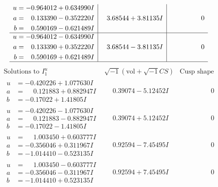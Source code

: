 \documentclass[1p]{elsarticle_modified}
\theoremstyle{definition}
\newcommand{\I}{\sqrt{-1}}
\begin{document}
$$\begin{array}{c|c|c}
\begin{aligned}
u &= -0.964012 + 0.634990 I \\
a &= \phantom{-}0.133390 - 0.352220 I \\
b &= \phantom{-}0.590169 - 0.621489 I\end{aligned}
 & \phantom{-}3.68544 + 3.81135 I & \phantom{-0.000000 } 0 \\ \hline\begin{aligned}
u &= -0.964012 - 0.634990 I \\
a &= \phantom{-}0.133390 + 0.352220 I \\
b &= \phantom{-}0.590169 + 0.621489 I\end{aligned}
 & \phantom{-}3.68544 - 3.81135 I & \phantom{-0.000000 } 0\\
 \hline 
 \end{array}$$\newpage$$\begin{array}{c|c|c}  
\text{Solutions to }I^u_{1}& \I (\text{vol} + \sqrt{-1}CS) & \text{Cusp shape}\\
 \hline 
\begin{aligned}
u &= -0.420226 + 1.077630 I \\
a &= \phantom{-}0.121883 + 0.882947 I \\
b &= -0.17022 + 1.41805 I\end{aligned}
 & \phantom{-}0.39074 - 5.12452 I & \phantom{-0.000000 } 0 \\ \hline\begin{aligned}
u &= -0.420226 - 1.077630 I \\
a &= \phantom{-}0.121883 - 0.882947 I \\
b &= -0.17022 - 1.41805 I\end{aligned}
 & \phantom{-}0.39074 + 5.12452 I & \phantom{-0.000000 } 0 \\ \hline\begin{aligned}
u &= \phantom{-}1.003450 + 0.603777 I \\
a &= -0.356046 + 0.311967 I \\
b &= -1.014410 - 0.523135 I\end{aligned}
 & \phantom{-}0.92594 - 7.45495 I & \phantom{-0.000000 } 0 \\ \hline\begin{aligned}
u &= \phantom{-}1.003450 - 0.603777 I \\
a &= -0.356046 - 0.311967 I \\
b &= -1.014410 + 0.523135 I\end{aligned}
 & \phantom{-}0.92594 + 7.45495 I & \phantom{-0.000000 } 0 \\ \hline\begin{aligned}

\end{aligned}
\end{array}$$
\end{document}
